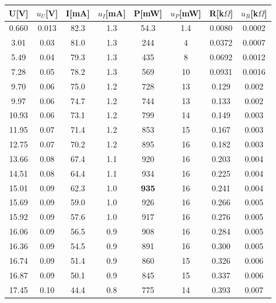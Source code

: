 \documentclass[12pt,a4paper]{article}
\begin{document}
\begin{table}[H]
    \centering
    \begin{tabular}{|c|c|c|c|c|c|c|c|}
    \hline
    U{[}V{]} & $u_U$[V] & I{[}mA{]} & $u_I$[mA] & P[mW] & $u_P$[mW] & R[k$\Omega$] & $u_R$[k$\Omega$] \\ \hline
    0.660    & 0.013 & 82.3      & 1.3 & 54.3 & 1.4 & 0.0080 & 0.0002 \\ \hline
    3.01     & 0.03  & 81.0      & 1.3 & 244  & 4   & 0.0372 & 0.0007 \\ \hline
    5.49     & 0.04  & 79.3      & 1.3 & 435  & 8   & 0.0692 & 0.0012 \\ \hline
    7.28     & 0.05  & 78.2      & 1.3 & 569  & 10  & 0.0931 & 0.0016 \\ \hline
    9.70     & 0.06  & 75.0      & 1.2 & 728  & 13  & 0.129  & 0.002  \\ \hline
    9.97     & 0.06  & 74.7      & 1.2 & 744  & 13  & 0.133  & 0.002  \\ \hline
    10.93    & 0.06  & 73.1      & 1.2 & 799  & 14  & 0.149  & 0.003  \\ \hline
    11.95    & 0.07  & 71.4      & 1.2 & 853  & 15  & 0.167  & 0.003  \\ \hline
    12.75    & 0.07  & 70.2      & 1.2 & 895  & 16  & 0.182  & 0.003  \\ \hline
    13.66    & 0.08  & 67.4      & 1.1 & 920  & 16  & 0.203  & 0.004  \\ \hline
    14.51    & 0.08  & 64.4      & 1.1 & 934  & 16  & 0.225  & 0.004  \\ \hline
    15.01    & 0.09  & 62.3      & 1.0 & \textbf{935}  & 16  & 0.241  & 0.004  \\ \hline
    15.69    & 0.09  & 59.0      & 1.0 & 926  & 16  & 0.266  & 0.005  \\ \hline
    15.92    & 0.09  & 57.6      & 1.0 & 917  & 16  & 0.276  & 0.005  \\ \hline
    16.06    & 0.09  & 56.5      & 0.9 & 908  & 16  & 0.284  & 0.005  \\ \hline
    16.36    & 0.09  & 54.5      & 0.9 & 891  & 16  & 0.300  & 0.005  \\ \hline
    16.74    & 0.09  & 51.4      & 0.9 & 860  & 15  & 0.326  & 0.006  \\ \hline
    16.87    & 0.09  & 50.1      & 0.9 & 845  & 15  & 0.337  & 0.006  \\ \hline
    17.45    & 0.10  & 44.4      & 0.8 & 775  & 14  & 0.393  & 0.007  \\ \hline

\end{tabular}
\end{table}
\end{document}
